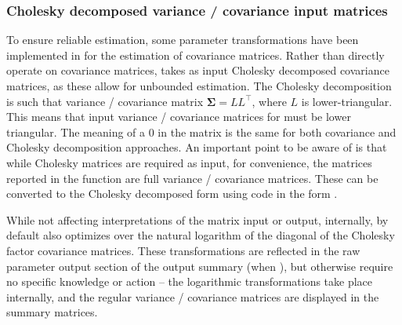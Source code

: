 \documentclass[nojss]{jss}\usepackage[]{graphicx}\usepackage[]{color}
\begin{document}
\subsubsection{Cholesky decomposed variance / covariance input matrices}\label{sec:transforms}\nopagebreak
To ensure reliable estimation, some parameter transformations have been implemented in  for the estimation of covariance matrices. Rather than directly operate on covariance matrices,  takes as input Cholesky decomposed covariance matrices, as these allow for unbounded estimation. The Cholesky decomposition is such that variance / covariance matrix $\boldsymbol{\Sigma} = LL^\top$, where $L$ is lower-triangular. This means that input variance / covariance matrices for  must be lower triangular. The meaning of a 0 in the matrix is the same for both covariance and Cholesky decomposition approaches. An important point to be aware of is that while Cholesky matrices are required as input, for convenience, the matrices reported in the  function are full variance / covariance matrices. These can be converted to the Cholesky decomposed form using code in the form .

While not affecting interpretations of the matrix input or output, internally, by default  also optimizes over the natural logarithm of the diagonal of the Cholesky factor covariance matrices. These transformations are reflected in the raw  parameter output section of the output summary (when ), but otherwise require no specific knowledge or action -- the logarithmic transformations take place internally, and the regular variance / covariance matrices are displayed in the summary matrices. 

\end{document}
